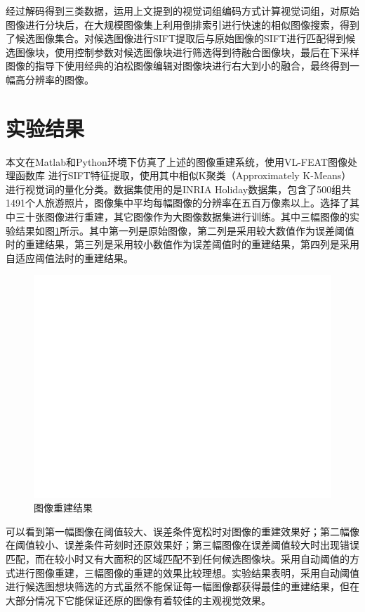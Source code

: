 \documentclass[UTF8]{csoarticle}
\begin{document}
经过解码得到三类数据，运用上文提到的视觉词组编码方式计算视觉词组，对原始图像进行分块后，在大规模图像集上利用倒排索引进行快速的相似图像搜索，得到了候选图像集合。对候选图像进行SIFT提取后与原始图像的SIFT进行匹配得到候选图像块，使用控制参数对候选图像块进行筛选得到待融合图像块，最后在下采样图像的指导下使用经典的泊松图像编辑\cite{Perez:2003ul}对图像块进行右大到小的融合，最终得到一幅高分辨率的图像。

\section{实验结果}
本文在Matlab和Python环境下仿真了上述的图像重建系统，使用VL-FEAT图像处理函数库
\cite{vl_feat}进行SIFT特征提取，使用其中相似K聚类（Approximately K-Means）进行视觉词的量化分类。数据集使用的是INRIA Holiday数据集\cite{INRIA}，包含了500组共1491个人旅游照片，图像集中平均每幅图像的分辨率在五百万像素以上。选择了其中三十张图像进行重建，其它图像作为大图像数据集进行训练。其中三幅图像的实验结果如图\ref{fig:result}所示。其中第一列是原始图像，第二列是采用较大数值作为误差阈值时的重建结果，第三列是采用较小数值作为误差阈值时的重建结果，第四列是采用自适应阈值法时的重建结果。

\begin{figure}
\centering\includegraphics[width=15cm]{rec_result}
\caption{图像重建结果}
\label{fig:result}
\end{figure}

可以看到第一幅图像在阈值较大、误差条件宽松时对图像的重建效果好；第二幅像在阈值较小、误差条件苛刻时还原效果好；第三幅图像在误差阈值较大时出现错误匹配，而在较小时又有大面积的区域匹配不到任何候选图像块。采用自动阈值的方式进行图像重建，三幅图像的重建的效果比较理想。实验结果表明，采用自动阈值进行候选图想块筛选的方式虽然不能保证每一幅图像都获得最佳的重建结果，但在大部分情况下它能保证还原的图像有着较佳的主观视觉效果。
\end{document}
